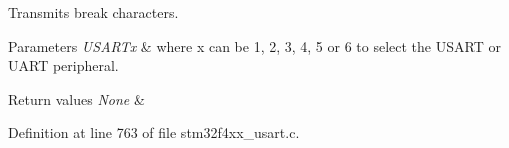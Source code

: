 Transmits break characters. 


\begin{DoxyParams}{Parameters}
{\em U\+S\+A\+R\+Tx} & where x can be 1, 2, 3, 4, 5 or 6 to select the U\+S\+A\+RT or U\+A\+RT peripheral. \\
\hline
\end{DoxyParams}

\begin{DoxyRetVals}{Return values}
{\em None} & \\
\hline
\end{DoxyRetVals}


Definition at line 763 of file stm32f4xx\+\_\+usart.\+c.

